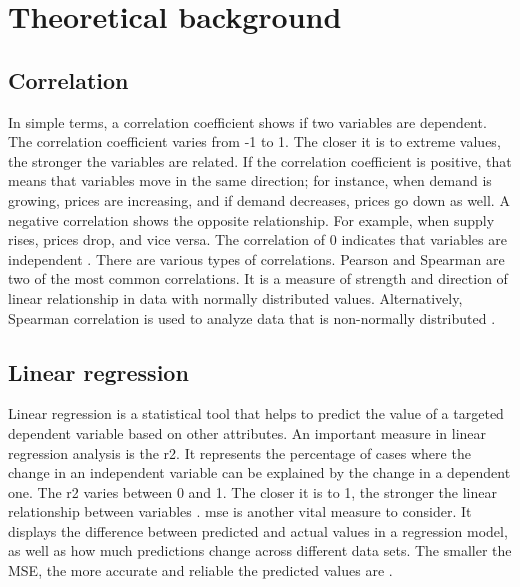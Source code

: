 \chapter{Theoretical background}
\section{Correlation}

In simple terms, a correlation coefficient shows if two variables are dependent. The correlation coefficient varies from -1 to 1. The closer it is to extreme values, the stronger the variables are related. If the correlation coefficient is positive, that means that variables move in the same direction; for instance, when demand is growing, prices are increasing, and if demand decreases, prices go down as well. A negative correlation shows the opposite relationship. For example, when supply rises, prices drop, and vice versa. The correlation of 0 indicates that variables are independent \autocite{DaCostaLewis2005}.
There are various types of correlations. Pearson and Spearman are two of the most common correlations. It is a measure of strength and direction of linear relationship in data with normally distributed values. Alternatively, Spearman correlation is used to analyze data that is non-normally distributed
\autocite{schoberCorrelationCoefficientsAppropriate2018}.

\section{Linear regression}

Linear regression is a statistical tool that helps to predict the value of a targeted dependent variable based on other attributes. An important measure in linear regression analysis is the \ac{r2}. It represents the percentage of cases where the change in an independent variable can be explained by the change in a dependent one. The \ac{r2} varies between 0 and 1. The closer it is to 1, the stronger the linear relationship between variables
\autocite{kumariLinearRegressionAnalysis2018}.
\ac{mse} is another vital measure to consider. It displays the difference between predicted and actual values in a regression model, as well as how much predictions change across different data sets. The smaller the MSE, the more accurate and reliable the predicted values are
\autocite{Schluchter2005}.
